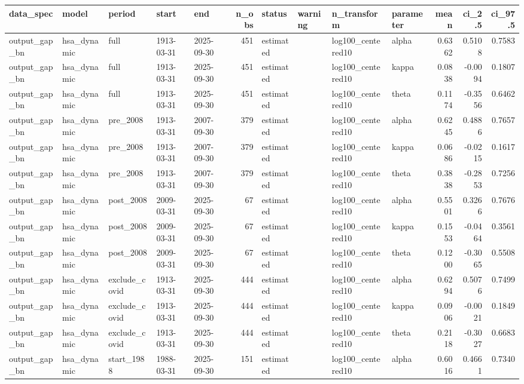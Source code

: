 \begin{tabular}{lllllrllllrrr}
\toprule
data\_spec & model & period & start & end & n\_obs & status & warning & n\_transform & parameter & mean & ci\_2.5 & ci\_97.5 \\
\midrule
output\_gap\_bn & hsa\_dynamic & full & 1913-03-31 & 2025-09-30 & 451 & estimated &  & log100\_centered10 & alpha & 0.6362 & 0.5108 & 0.7583 \\
output\_gap\_bn & hsa\_dynamic & full & 1913-03-31 & 2025-09-30 & 451 & estimated &  & log100\_centered10 & kappa & 0.0838 & -0.0094 & 0.1807 \\
output\_gap\_bn & hsa\_dynamic & full & 1913-03-31 & 2025-09-30 & 451 & estimated &  & log100\_centered10 & theta & 0.1174 & -0.3556 & 0.6462 \\
output\_gap\_bn & hsa\_dynamic & pre\_2008 & 1913-03-31 & 2007-09-30 & 379 & estimated &  & log100\_centered10 & alpha & 0.6245 & 0.4886 & 0.7657 \\
output\_gap\_bn & hsa\_dynamic & pre\_2008 & 1913-03-31 & 2007-09-30 & 379 & estimated &  & log100\_centered10 & kappa & 0.0686 & -0.0215 & 0.1617 \\
output\_gap\_bn & hsa\_dynamic & pre\_2008 & 1913-03-31 & 2007-09-30 & 379 & estimated &  & log100\_centered10 & theta & 0.3838 & -0.2853 & 0.7256 \\
output\_gap\_bn & hsa\_dynamic & post\_2008 & 2009-03-31 & 2025-09-30 & 67 & estimated &  & log100\_centered10 & alpha & 0.5501 & 0.3266 & 0.7676 \\
output\_gap\_bn & hsa\_dynamic & post\_2008 & 2009-03-31 & 2025-09-30 & 67 & estimated &  & log100\_centered10 & kappa & 0.1553 & -0.0464 & 0.3561 \\
output\_gap\_bn & hsa\_dynamic & post\_2008 & 2009-03-31 & 2025-09-30 & 67 & estimated &  & log100\_centered10 & theta & 0.1200 & -0.3065 & 0.5508 \\
output\_gap\_bn & hsa\_dynamic & exclude\_covid & 1913-03-31 & 2025-09-30 & 444 & estimated &  & log100\_centered10 & alpha & 0.6294 & 0.5076 & 0.7499 \\
output\_gap\_bn & hsa\_dynamic & exclude\_covid & 1913-03-31 & 2025-09-30 & 444 & estimated &  & log100\_centered10 & kappa & 0.0906 & -0.0021 & 0.1849 \\
output\_gap\_bn & hsa\_dynamic & exclude\_covid & 1913-03-31 & 2025-09-30 & 444 & estimated &  & log100\_centered10 & theta & 0.2118 & -0.3027 & 0.6683 \\
output\_gap\_bn & hsa\_dynamic & start\_1988 & 1988-03-31 & 2025-09-30 & 151 & estimated &  & log100\_centered10 & alpha & 0.6016 & 0.4661 & 0.7340 \\

\end{tabular}
